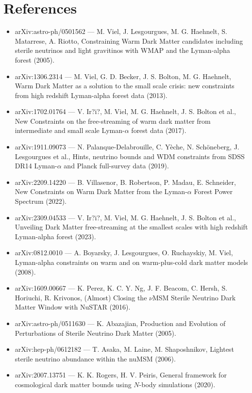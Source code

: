 \documentclass[11pt,a4paper]{article}
\begin{document}
\section*{References}
\begin{itemize}
\item arXiv:astro-ph/0501562 --- M. Viel, J. Lesgourgues, M. G. Haehnelt, S. Matarrese, A. Riotto, Constraining Warm Dark Matter candidates including sterile neutrinos and light gravitinos with WMAP and the Lyman-alpha forest (2005).
\item arXiv:1306.2314 --- M. Viel, G. D. Becker, J. S. Bolton, M. G. Haehnelt, Warm Dark Matter as a solution to the small scale crisis: new constraints from high redshift Lyman-alpha forest data (2013).
\item arXiv:1702.01764 --- V. Ir?i?, M. Viel, M. G. Haehnelt, J. S. Bolton et al., New Constraints on the free-streaming of warm dark matter from intermediate and small scale Lyman-$\alpha$ forest data (2017).
\item arXiv:1911.09073 --- N. Palanque-Delabrouille, C. Yèche, N. Schöneberg, J. Lesgourgues et al., Hints, neutrino bounds and WDM constraints from SDSS DR14 Lyman-$\alpha$ and Planck full-survey data (2019).
\item arXiv:2209.14220 --- B. Villasenor, B. Robertson, P. Madau, E. Schneider, New Constraints on Warm Dark Matter from the Lyman-$\alpha$ Forest Power Spectrum (2022).
\item arXiv:2309.04533 --- V. Ir?i?, M. Viel, M. G. Haehnelt, J. S. Bolton et al., Unveiling Dark Matter free-streaming at the smallest scales with high redshift Lyman-alpha forest (2023).
\item arXiv:0812.0010 --- A. Boyarsky, J. Lesgourgues, O. Ruchayskiy, M. Viel, Lyman-alpha constraints on warm and on warm-plus-cold dark matter models (2008).
\item arXiv:1609.00667 --- K. Perez, K. C. Y. Ng, J. F. Beacom, C. Hersh, S. Horiuchi, R. Krivonos, (Almost) Closing the $\nu$MSM Sterile Neutrino Dark Matter Window with NuSTAR (2016).
\item arXiv:astro-ph/0511630 --- K. Abazajian, Production and Evolution of Perturbations of Sterile Neutrino Dark Matter (2005).
\item arXiv:hep-ph/0612182 --- T. Asaka, M. Laine, M. Shaposhnikov, Lightest sterile neutrino abundance within the nuMSM (2006).
\item arXiv:2007.13751 --- K. K. Rogers, H. V. Peiris, General framework for cosmological dark matter bounds using $N$-body simulations (2020).

\end{itemize}
\end{document}

